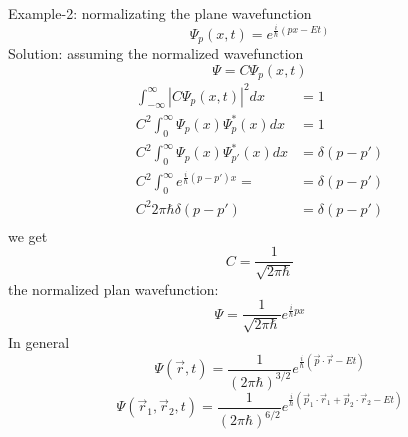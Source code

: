 \begin{frame}[allowframebreaks=]  
    \alert{Example-2:}  normalizating the plane wavefunction \[\Psi_p (x,t)=e^{\frac{i}{\hbar}(px-Et)} \] 
    \alert{Solution:}  assuming the normalized wavefunction 
    \[\Psi=C\Psi_p (x,t)\]
    \begin{equation*}
        \begin{split}
            \int_{-\infty} ^\infty |C\Psi_p (x,t)|^2 dx &=1  \\
            C^2 \int_0 ^\infty \Psi_p (x) \Psi_{p} ^* (x) dx &=1  \\
            C^2 \int_0 ^\infty \Psi_p (x) \Psi_{p'} ^* (x) dx &=\delta (p-p')  \\
            C^2 \int_0 ^\infty e^{\frac{i}{\hbar}(p-p')x} =&=\delta (p-p')\\
            C^2 2\pi \hbar \delta (p-p') &=\delta(p-p') \\
        \end{split} 
     \end{equation*}
     we get 
     \[C= \dfrac{1}{\sqrt{2\pi \hbar}}\]
     the normalized plan wavefunction:
     \begin{equation*}
        \Psi=\frac{1}{\sqrt{2\pi \hbar}} e^{\frac{i}{\hbar}px}
    \end{equation*}  
    In general
    \[ \Psi(\vec r ,t)=\frac{1}{(2\pi \hbar)^{3/2}} e^{\frac{i}{\hbar}(\vec p\cdot \vec r -Et)} \]
    \[ \Psi(\vec r_1 ,\vec r_2, t)=\frac{1}{(2\pi \hbar)^{6/2}} e^{\frac{i}{\hbar}(\vec p_1 \cdot \vec r_1 +\vec p_2 \cdot \vec r_2 -Et)} \]
\end{frame}


